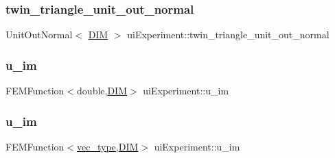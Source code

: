 \mbox{\label{classui_experiment_a3240a812867c50cd296cff62e86731d5}} 
\subsubsection{\texorpdfstring{twin\+\_\+triangle\+\_\+unit\+\_\+out\+\_\+normal}{twin\_triangle\_unit\_out\_normal}}
{\footnotesize\ttfamily Unit\+Out\+Normal$<$ \mbox{\hyperlink{complex__node___t_h_f_e_m_2uiexp_8h_a589b8b9bfdf714f736059845d568b597}{D\+IM}} $>$ ui\+Experiment\+::twin\+\_\+triangle\+\_\+unit\+\_\+out\+\_\+normal\hspace{0.3cm}{\ttfamily [private]}}

\mbox{\label{classui_experiment_a52c236e8afbb37ae0baa97ada2305d93}} 
\subsubsection{\texorpdfstring{u\+\_\+im}{u\_im}\hspace{0.1cm}{\footnotesize\ttfamily [1/2]}}
{\footnotesize\ttfamily F\+E\+M\+Function$<$double,\mbox{\hyperlink{complex__node___t_h_f_e_m_2uiexp_8h_a589b8b9bfdf714f736059845d568b597}{D\+IM}}$>$ ui\+Experiment\+::u\+\_\+im\hspace{0.3cm}{\ttfamily [private]}}

\mbox{\label{classui_experiment_aa50bc0a5012bc931d4d42ca06c303a45}} 
\subsubsection{\texorpdfstring{u\+\_\+im}{u\_im}\hspace{0.1cm}{\footnotesize\ttfamily [2/2]}}
{\footnotesize\ttfamily F\+E\+M\+Function$<$\mbox{\hyperlink{complex__edge___t_h_f_e_m_2emdefs_8h_a0a0de407de54661e0d56aa8686c104d9}{vec\+\_\+type}},\mbox{\hyperlink{complex__node___t_h_f_e_m_2uiexp_8h_a589b8b9bfdf714f736059845d568b597}{D\+IM}}$>$ ui\+Experiment\+::u\+\_\+im\hspace{0.3cm}{\ttfamily [private]}}

